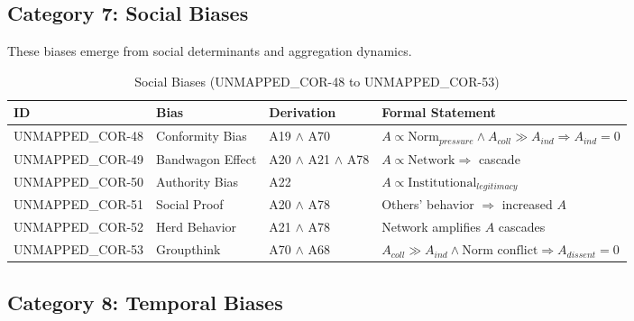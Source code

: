 
\subsection{Category 7: Social Biases}

These biases emerge from social determinants and aggregation dynamics.

\begin{table}[htbp]
\small
\centering
\caption{Social Biases (UNMAPPED_COR-48 to UNMAPPED_COR-53)}
\label{tab:cor-social}
\begin{tabular}{p{1.2cm}p{2.8cm}p{3.8cm}p{5cm}}
\toprule
\textbf{ID} & \textbf{Bias} & \textbf{Derivation} & \textbf{Formal Statement} \\
\midrule
UNMAPPED_COR-48 & Conformity Bias & A19 $\land$ A70 & $A \propto \text{Norm}_{pressure} \land A_{coll} \gg A_{ind} \Rightarrow A_{ind} = 0$ \\
UNMAPPED_COR-49 & Bandwagon Effect & A20 $\land$ A21 $\land$ A78 & $A \propto \text{Network} \Rightarrow$ cascade \\
UNMAPPED_COR-50 & Authority Bias & A22 & $A \propto \text{Institutional}_{legitimacy}$ \\
UNMAPPED_COR-51 & Social Proof & A20 $\land$ A78 & Others' behavior $\Rightarrow$ increased $A$ \\
UNMAPPED_COR-52 & Herd Behavior & A21 $\land$ A78 & Network amplifies $A$ cascades \\
UNMAPPED_COR-53 & Groupthink & A70 $\land$ A68 & $A_{coll} \gg A_{ind} \land \text{Norm conflict} \Rightarrow A_{dissent} = 0$ \\
\bottomrule
\end{tabular}
\end{table}


\subsection{Category 8: Temporal Biases}

